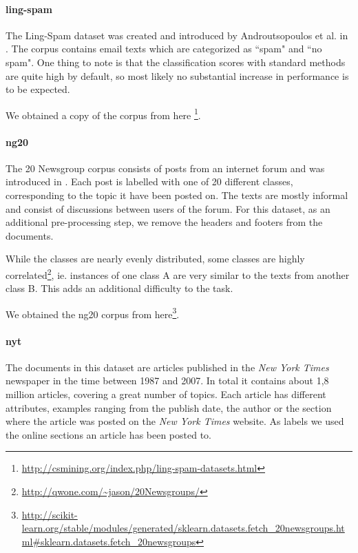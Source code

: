 
\paragraph{ling-spam}
The Ling-Spam dataset was created and introduced by Androutsopoulos et al. in  \cite{Androutsopoulos2000}.
The corpus contains email texts which are categorized as ``spam" and ``no spam".
One thing to note is that the classification scores with standard methods are quite high by default, so most likely no substantial increase in performance is to be expected.

We obtained a copy of the corpus from here \footnote{\url{http://csmining.org/index.php/ling-spam-datasets.html}}.


\paragraph{ng20}
The 20 Newsgroup corpus consists of posts from an internet forum and was introduced in \cite{Lang}. Each post is labelled with one of 20 different classes, corresponding to the topic it have been posted on. The texts are mostly informal and consist of discussions between users of the forum.
For this dataset, as an additional pre-processing step, we remove the headers and footers from the documents.

While the classes are nearly evenly distributed, some classes are highly correlated\footnote{\url{http://qwone.com/~jason/20Newsgroups/}}, ie. instances of one class A are very similar to the texts from another class B. This adds an additional difficulty to the task.

We obtained the ng20 corpus from here\footnote{\url{http://scikit-learn.org/stable/modules/generated/sklearn.datasets.fetch\_20newsgroups.html\#sklearn.datasets.fetch_20newsgroups}}.

\paragraph{nyt}
The documents in this dataset are articles published in the \textit{New York Times} newspaper in the time between 1987 and 2007.
In total it contains about 1,8 million articles, covering a great number of topics.
Each article has different attributes, examples ranging from the publish date, the author or the section where the article was posted on the \textit{New York Times} website.
As labels we used the online sections an article has been posted to.

